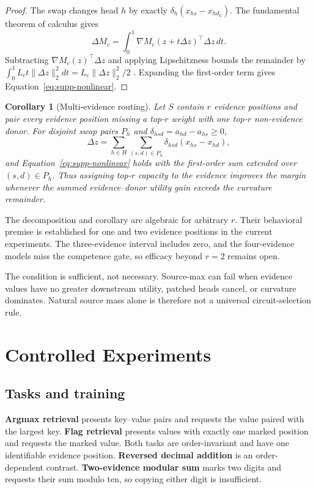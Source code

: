 \documentclass[letterpaper]{article} %
\newtheorem{corollary}[theorem]{Corollary}
\begin{document}
\begin{proof}
The swap changes head $h$ by exactly $\delta_h(x_{hs}-x_{hd_h})$. The fundamental theorem of calculus gives
\begin{equation}
\Delta M_c=\int_0^1\nabla M_c(z+t\Delta z)^\top\Delta z\,dt.
\end{equation}
Subtracting $\nabla M_c(z)^\top\Delta z$ and applying Lipschitzness bounds the remainder by
$\int_0^1L_ct\lVert\Delta z\rVert_2^2dt=L_c\lVert\Delta z\rVert_2^2/2$
\citep{nesterov2004}. Expanding the first-order term gives Equation~\ref{eq:supp-nonlinear}.
\end{proof}

\begin{corollary}[Multi-evidence routing]
Let $S$ contain $r$ evidence positions and pair every evidence position missing a top-$r$ weight with one
top-$r$ non-evidence donor. For disjoint swap pairs $P_h$ and
$\delta_{hsd}=a_{hd}-a_{hs}\ge0$,
\begin{equation}
\Delta z=\sum_{h\in H}\sum_{(s,d)\in P_h}\delta_{hsd}(x_{hs}-x_{hd}),
\end{equation}
and Equation~\ref{eq:supp-nonlinear} holds with the first-order sum extended over $(s,d)\in P_h$.
Thus assigning top-$r$ capacity to the evidence improves the margin whenever the summed evidence--donor
utility gain exceeds the curvature remainder.
\end{corollary}

The decomposition and corollary are algebraic for arbitrary $r$. Their behavioral premise is established for
one and two evidence positions in the current experiments. The three-evidence interval includes zero, and the
four-evidence models miss the competence gate, so efficacy beyond $r=2$ remains open.

The condition is sufficient, not necessary. Source-max can fail when evidence values have no greater
downstream utility, patched heads cancel, or curvature dominates. Natural source mass alone is therefore not
a universal circuit-selection rule.

\section{Controlled Experiments}

\subsection{Tasks and training}

\textbf{Argmax retrieval} presents key--value pairs and requests the value paired with the largest key.
\textbf{Flag retrieval} presents values with exactly one marked position and requests the marked value.
Both tasks are order-invariant and have one identifiable evidence position. \textbf{Reversed decimal
addition} is an order-dependent contrast. \textbf{Two-evidence modular sum} marks two digits and requests
their sum modulo ten, so copying either digit is insufficient.
\end{document}
